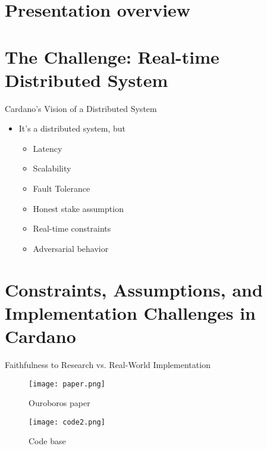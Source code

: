 \documentclass{beamer}
\begin{document}
\section{Presentation overview}

\section{The Challenge: Real-time Distributed System}

\begin{frame}{Cardano's Vision of a Distributed System}
  \begin{itemize}
    \item It's a distributed system, but
    \begin{itemize}
      \item Latency
      \item Scalability
      \item Fault Tolerance
      \item Honest stake assumption
      \item Real-time constraints
      \item Adversarial behavior
    \end{itemize}
  \end{itemize}

\end{frame}

\section{Constraints, Assumptions, and Implementation Challenges in Cardano}

\begin{frame}{Faithfulness to Research vs. Real-World Implementation}
  \begin{figure}[h]
      \centering
      \begin{minipage}{0.45\textwidth}
          \centering
          \texttt{[image: paper.png]} %
          \caption{Ouroboros paper}
      \end{minipage}\hfill
      \begin{minipage}{0.45\textwidth}
          \centering
          \texttt{[image: code2.png]} %
          \caption{Code base}
      \end{minipage}
  \end{figure}
\end{frame}
\end{document}

